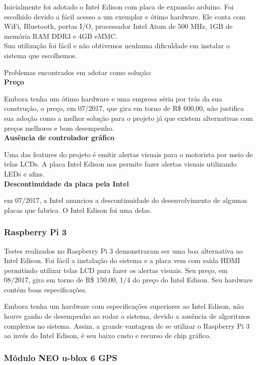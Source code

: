 \documentclass[
	12pt,				%
	oneside,			%
	a4paper,			%
	brazil				%
]{abntex2}
\begin{document}
Inicialmente foi adotado o Intel Edison com placa de expansão arduino. Foi escolhido devido a fácil acesso a um exemplar e ótimo hardware. Ele conta com WiFi, Bluetooth, portas I/O, processador Intel Atom de 500 MHz, 1GB de memória RAM DDR3 e 4GB eMMC. \\
Sua utilização foi fácil e não obtivemos nenhuma dificuldade em instalar o sistema que escolhemos.


Problemas encontrados em adotar como solução:
\\

\textbf{Preço}

Embora tenha um ótimo hardware e uma empresa séria por trás da sua construção, o preço, em 07/2017, que gira em torno de R\$ 600,00, não justifica sua adoção como a melhor solução para o projeto já que existem alternativas com preços melhores e bom desempenho.
\\

\textbf{Ausência de controlador gráfico}

Uma das features do projeto é emitir alertas visuais para o motorista por meio de telas LCDs. A placa Intel Edison nos permite fazer alertas visuais utilizando LEDs e afins. 
\\

\textbf{Descontinuidade da placa pela Intel}

em 07/2017, a Intel anunciou a descontinuidade do desenvolvimento de algumas placas que fabrica. O Intel Edison foi uma delas.

\subsubsection{Raspberry Pi 3}

Testes realizados no Raspberry Pi 3 demonstraram ser uma boa alternativa ao Intel Edison. Foi fácil a instalação do sistema e a placa vem com saída HDMI permitindo utilizar telas LCD para fazer os alertas visuais.
Seu preço, em 08/2017, gira em torno de R\$ 150,00, 1/4 do preço do Intel Edison. Seu hardware contém boas especificações.

Embora tenha um hardware com especificações superiores ao Intel Edison, não houve ganho de desempenho ao rodar o sistema, devido a ausência de algoritmos complexos no sistema. Assim, a grande vantagem de se utilizar o Raspberry Pi 3 ao invés do Intel Edison, é seu baixo custo e recurso de chip gráfico.

\subsubsection{Módulo NEO u-blox 6 GPS}
\end{document}
